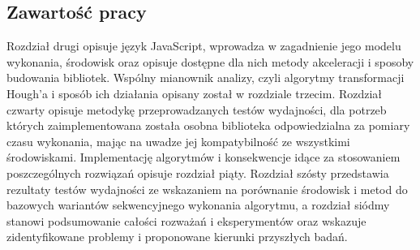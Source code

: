 \subsection{Zawartość pracy}

Rozdział drugi opisuje język JavaScript, wprowadza w zagadnienie jego modelu wykonania, środowisk oraz opisuje dostępne dla nich metody akceleracji i sposoby budowania bibliotek. Wspólny mianownik analizy, czyli algorytmy transformacji Hough'a i sposób ich działania opisany został w rozdziale trzecim. Rozdział czwarty opisuje metodykę przeprowadzanych testów wydajności, dla potrzeb których zaimplementowana została osobna biblioteka odpowiedzialna za pomiary czasu wykonania, mając na uwadze jej kompatybilność ze wszystkimi środowiskami. Implementację algorytmów i konsekwencje idące za stosowaniem poszczególnych rozwiązań opisuje rozdział piąty. Rozdział szósty przedstawia rezultaty testów wydajności ze wskazaniem na porównanie środowisk i metod do bazowych wariantów sekwencyjnego wykonania algorytmu, a rozdział siódmy stanowi podsumowanie całości rozważań i eksperymentów oraz wskazuje zidentyfikowane problemy i proponowane kierunki przyszłych badań.
